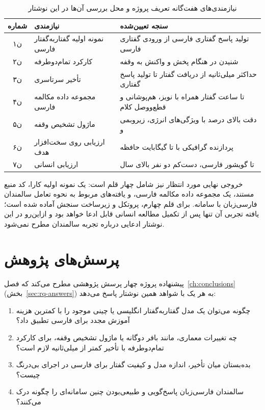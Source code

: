 \begin{table}[ht]
\centering
\caption{نیازمندی‌های هفت‌گانه تعریف پروژه و محل بررسی آن‌ها در این نوشتار}
\label{tab:requirements}
\small
\begin{tabular}{clL{6.2cm}}
\toprule
\textbf{شماره} & \textbf{نیازمندی} & \textbf{سنجه تعیین‌شده} \\
\midrule
ن۱ & نمونه اولیه گفتار‌به‌گفتار فارسی & تولید پاسخ گفتاری فارسی از ورودی
      گفتاری فارسی \\
ن۲ & کارکرد تمام‌دوطرفه & شنیدن در هنگام پخش و واکنش به وقفه \\
ن۳ & تأخیر سرتاسری & حداکثر  میلی‌ثانیه از دریافت گفتار تا تولید پاسخ
      گفتاری \\
ن۴ & مجموعه داده مکالمه فارسی &  تا  ساعت گفتار همراه با نویز،
      هم‌پوشانی و قطع‌و‌وصل کلام \\
ن۵ & ماژول تشخیص وقفه & دقت بالای  درصد با ویژگی‌های انرژی، زیر‌و‌بمی و
       \\
ن۶ & ارزیابی روی سخت‌افزار هدف & پردازنده گرافیکی با  تا  گیگابایت
      حافظه \\
ن۷ & ارزیابی انسانی &  تا  گویشور فارسی، دست‌کم دو نفر بالای
       سال \\
\bottomrule
\end{tabular}
\end{table}

خروجی نهایی مورد انتظار نیز شامل چهار قلم است: یک نمونه اولیه کارا، کد منبع
مستند، یک مجموعه داده مکالمه فارسی، و یافته‌های مربوط به نحوه تعامل سالمندان
فارسی‌زبان با سامانه. برای قلم چهارم، پروتکل و زیرساخت سنجش آماده شده است؛
یافته تجربی آن تنها پس از تکمیل مطالعه انسانی قابل ادعا خواهد بود و ازاین‌رو
در این نوشتار ادعایی درباره تجربه سالمندان مطرح نمی‌شود.

\section{پرسش‌های پژوهش}
\label{sec:rq}

پیشنهاده پروژه چهار پرسش پژوهشی مطرح می‌کند که فصل~\ref{ch:conclusions}
(بخش~\ref{sec:rq-answers}) به هر یک با شواهد همین نوشتار پاسخ می‌دهد:

\begin{enumerate}
\item {} چگونه می‌توان یک مدل گفتار‌به‌گفتار انگلیسی یا چینی موجود
را با کمترین هزینه آموزش مجدد برای فارسی تطبیق داد؟
\item {} چه تغییرات معماری، مانند بافر دوگانه یا ماژول تشخیص وقفه،
برای کارکرد تمام‌دوطرفه با تأخیر کمتر از  میلی‌ثانیه لازم است؟
\item {} بده‌بستان میان تأخیر، اندازه مدل و کیفیت گفتار برای فارسی
در اجرای بی‌درنگ چیست؟
\item {} سالمندان فارسی‌زبان پاسخ‌گویی و طبیعی‌بودن چنین سامانه‌ای را
چگونه درک می‌کنند؟
\end{enumerate}


